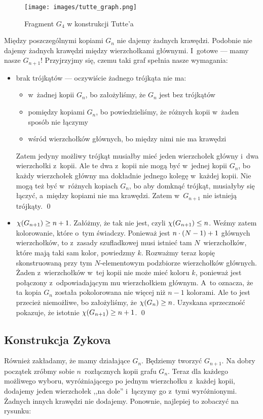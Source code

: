 \begin{figure}[H]
	\centering
	\texttt{[image: images/tutte\_graph.png]}
	\caption{Fragment \(G_4\) w konstrukcji Tutte'a}
\end{figure}

Między poszczególnymi kopiami \(G_n\) nie dajemy żadnych krawędzi. Podobnie nie dajemy żadnych krawędzi między wierzchołkami głównymi. I~gotowe --- mamy nasze \(G_{n + 1}\)! Przyjrzyjmy się, czemu taki graf spełnia nasze wymagania:
\begin{itemize}
	\item brak trójkątów --- oczywiście żadnego trójkąta nie ma:
	      \begin{itemize}
		      \item w~żadnej kopii \(G_n\), bo założyliśmy, że \(G_n\) jest bez trójkątów
		      \item pomiędzy kopiami \(G_n\), bo powiedzieliśmy, że różnych kopii w~żaden sposób nie łączymy
		      \item wśród wierzchołków głównych, bo między nimi nie ma krawędzi
	      \end{itemize}
	      Zatem jedyny możliwy trójkąt musiałby mieć jeden wierzchołek główny i~dwa wierzchołki z~kopii. Ale te dwa z~kopii nie mogą być w~jednej kopii \(G_n\), bo każdy wierzchołek główny ma dokładnie jednego kolegę w~każdej kopii. Nie mogą też być w~różnych kopiach \(G_n\), bo aby domknąć trójkąt, musiałyby się łączyć, a~między kopiami nie ma krawędzi. Zatem w~\(G_{n + 1}\) nie istnieją trójkąty.
	      \qed
	\item \(\chi\pars{G_{n + 1}} \geq n + 1\). Załóżmy, że tak nie jest, czyli \(\chi\pars{G_{n + 1}} \leq n\). Weźmy zatem kolorowanie, które o~tym świadczy. Ponieważ jest \(n \cdot \left(N - 1\right) + 1\) głównych wierzchołków, to z~zasady szufladkowej musi istnieć tam \(N\)~wierzchołków, które mają taki sam kolor, powiedzmy \(k\). Rozważmy teraz kopię skonstruowaną przy tym \(N\)-elementowym podzbiorze wierzchołków głównych. Żaden z~wierzchołków w~tej kopii nie może mieć koloru \(k\), ponieważ jest połączony z~odpowiadającym mu wierzchołkiem głównym. A~to oznacza, że ta kopia \(G_n\) została pokolorowana nie więcej niż \(n - 1\) kolorami. Ale to jest przecież niemożliwe, bo założyliśmy, że \(\chi\pars{G_n} \geq n\). Uzyskana sprzeczność pokazuje, że istotnie \(\chi\pars{G_{n + 1}} \geq n + 1\).
	      \qed
\end{itemize}

\subsection{Konstrukcja Zykova}
Również zakładamy, że mamy działające \(G_n\). Będziemy tworzyć \(G_{n + 1}\). Na dobry początek zróbmy sobie \(n\)~rozłącznych kopii grafu \(G_n\). Teraz dla każdego możliwego wyboru, wyróżniającego po jednym wierzchołku z~każdej kopii, dodajemy jeden wierzchołek ,,na dole'' i~łączymy go z~tymi wyróżnionymi. Żadnych innych krawędzi nie dodajemy. Ponownie, najlepiej to zobaczyć na rysunku:

